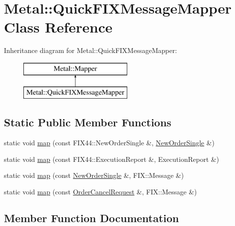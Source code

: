 \hypertarget{classMetal_1_1QuickFIXMessageMapper}{}\section{Metal\+:\+:Quick\+F\+I\+X\+Message\+Mapper Class Reference}
\label{classMetal_1_1QuickFIXMessageMapper}
Inheritance diagram for Metal\+:\+:Quick\+F\+I\+X\+Message\+Mapper\+:\begin{figure}[H]
\begin{center}
\leavevmode
\includegraphics[height=2.000000cm]{classMetal_1_1QuickFIXMessageMapper}
\end{center}
\end{figure}
\subsection*{Static Public Member Functions}
\begin{DoxyCompactItemize}
\item 
static void \hyperlink{classMetal_1_1QuickFIXMessageMapper_ad42b0f6ed92b6e777e3716de55b20f21}{map} (const F\+I\+X44\+::\+New\+Order\+Single \&, \hyperlink{classMetal_1_1NewOrderSingle}{New\+Order\+Single} \&)
\item 
static void \hyperlink{classMetal_1_1QuickFIXMessageMapper_a98184463c76af4e0a21e8dfbd4b61af4}{map} (const F\+I\+X44\+::\+Execution\+Report \&, Execution\+Report \&)
\item 
static void \hyperlink{classMetal_1_1QuickFIXMessageMapper_ad5c9c32bc745db35e7d2a472cb204514}{map} (const \hyperlink{classMetal_1_1NewOrderSingle}{New\+Order\+Single} \&, F\+I\+X\+::\+Message \&)
\item 
static void \hyperlink{classMetal_1_1QuickFIXMessageMapper_ab7692db7b3f7b616acd7c6e9fc024d2c}{map} (const \hyperlink{classMetal_1_1OrderCancelRequest}{Order\+Cancel\+Request} \&, F\+I\+X\+::\+Message \&)
\end{DoxyCompactItemize}


\subsection{Member Function Documentation}
\hypertarget{classMetal_1_1QuickFIXMessageMapper_ad42b0f6ed92b6e777e3716de55b20f21}{}
